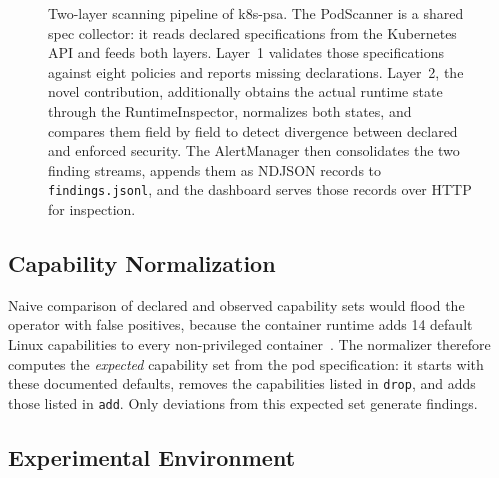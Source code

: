 \documentclass[conference]{IEEEtran}
\begin{document}
\begin{figure}[htbp]
{%
}
\caption{Two-layer scanning pipeline of k8s-psa. The PodScanner is a shared spec collector: it reads declared specifications from the Kubernetes API and feeds both layers. Layer~1 validates those specifications against eight policies and reports missing declarations. Layer~2, the novel contribution, additionally obtains the actual runtime state through the RuntimeInspector, normalizes both states, and compares them field by field to detect divergence between declared and enforced security. The AlertManager then consolidates the two finding streams, appends them as NDJSON records to \texttt{findings.jsonl}, and the dashboard serves those records over HTTP for inspection.}
\label{fig:pipeline}
\end{figure}

\subsection{Capability Normalization}

Naive comparison of declared and observed capability sets would flood the operator with false positives, because the container runtime adds 14 default Linux capabilities to every non-privileged container~\cite{dockerseccomp2024}. The normalizer therefore computes the \emph{expected} capability set from the pod specification: it starts with these documented defaults, removes the capabilities listed in \texttt{drop}, and adds those listed in \texttt{add}. Only deviations from this expected set generate findings.

\subsection{Experimental Environment}
\label{sec:env}
\end{document}
